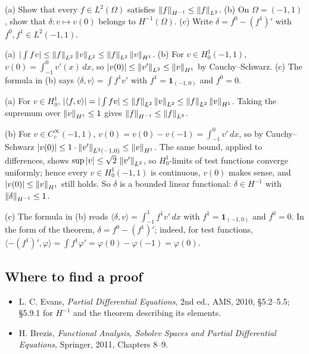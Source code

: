 \begin{exercise}
  (a) Show that every $f \in L^2(\Omega)$ satisfies $\left\lVert f\right\rVert_{H^{-1}} \le \left\lVert f\right\rVert_{L^2}$. (b) On $\Omega = (-1,1)$, show that $\delta: v \mapsto v(0)$ belongs to $H^{-1}(\Omega)$. (c) Write $\delta = f^0 - (f^1)'$ with $f^0, f^1 \in L^2(-1,1)$.
  \begin{hint}
    (a) $|\int f v| \le \left\lVert f\right\rVert_{L^2}\left\lVert v\right\rVert_{L^2} \le \left\lVert f\right\rVert_{L^2}\left\lVert v\right\rVert_{H^1}$. (b) For $v \in H^1_0(-1,1)$, $v(0) = \int_{-1}^0 v'(x)\,dx$, so $|v(0)| \le \left\lVert v'\right\rVert_{L^2} \le \left\lVert v\right\rVert_{H^1}$ by Cauchy--Schwarz. (c) The formula in (b) says $\langle \delta, v\rangle = \int f^1 v'$ with $f^1 = \mathbf{1}_{(-1,0)}$ and $f^0 = 0$.
  \end{hint}
  \begin{solution}
    (a) For $v \in H^1_0$, $|\langle f,v\rangle| = |\int fv| \le \left\lVert f\right\rVert_{L^2}\left\lVert v\right\rVert_{L^2} \le \left\lVert f\right\rVert_{L^2}\left\lVert v\right\rVert_{H^1}$. Taking the supremum over $\left\lVert v\right\rVert_{H^1} \le 1$ gives $\left\lVert f\right\rVert_{H^{-1}} \le \left\lVert f\right\rVert_{L^2}$.

    (b) For $v \in C_c^\infty(-1,1)$, $v(0) = v(0) - v(-1) = \int_{-1}^0 v'\,dx$, so by Cauchy--Schwarz $|v(0)| \le 1\cdot\left\lVert v'\right\rVert_{L^2(-1,0)} \le \left\lVert v\right\rVert_{H^1}$. The same bound, applied to differences, shows $\sup|v| \le \sqrt2\,\left\lVert v'\right\rVert_{L^2}$, so $H^1_0$-limits of test functions converge uniformly; hence every $v \in H^1_0(-1,1)$ is continuous, $v(0)$ makes sense, and $|v(0)| \le \left\lVert v\right\rVert_{H^1}$ still holds. So $\delta$ is a bounded linear functional: $\delta \in H^{-1}$ with $\left\lVert \delta\right\rVert_{H^{-1}} \le 1$.

    (c) The formula in (b) reads $\langle\delta, v\rangle = \int_{-1}^1 f^1 v'\,dx$ with $f^1 = \mathbf{1}_{(-1,0)}$ and $f^0 = 0$. In the form of the theorem, $\delta = f^0 - (f^1)'$; indeed, for test functions, $\langle -(f^1)', \varphi\rangle = \int f^1\varphi' = \varphi(0) - \varphi(-1) = \varphi(0)$.
  \end{solution}
\end{exercise}

\subsection*{Where to find a proof}

\begin{itemize}
\item L. C. Evans, \emph{Partial Differential Equations}, 2nd ed., AMS, 2010, §5.2--5.5; §5.9.1 for $H^{-1}$ and the theorem describing its elements.
\item H. Brezis, \emph{Functional Analysis, Sobolev Spaces and Partial Differential Equations}, Springer, 2011, Chapters 8--9.
\end{itemize}

\neededfor
